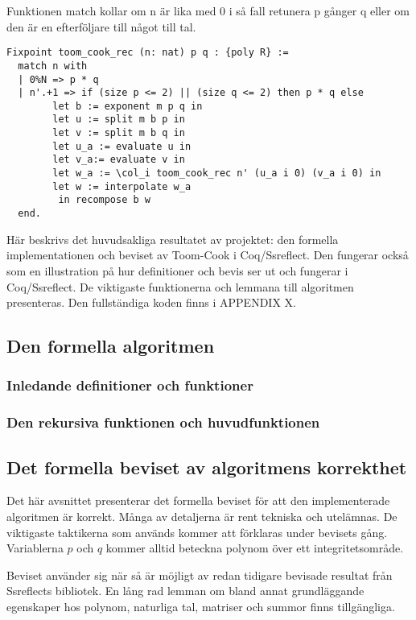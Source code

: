 Funktionen match kollar om n är lika med 0 i så fall retunera p gånger q eller
om den är en efterföljare till något till tal.

\begin{verbatim}
Fixpoint toom_cook_rec (n: nat) p q : {poly R} :=
  match n with
  | 0%N => p * q
  | n'.+1 => if (size p <= 2) || (size q <= 2) then p * q else
        let b := exponent m p q in
        let u := split m b p in
        let v := split m b q in
        let u_a := evaluate u in
        let v_a:= evaluate v in
        let w_a := \col_i toom_cook_rec n' (u_a i 0) (v_a i 0) in
        let w := interpolate w_a
         in recompose b w
  end.
\end{verbatim}
Här beskrivs det huvudsakliga resultatet av projektet: den formella
implementationen och beviset av Toom-Cook i Coq/Ssreflect. Den fungerar också
som en illustration på hur definitioner och bevis ser ut och fungerar i
Coq/Ssreflect. De viktigaste funktionerna och lemmana till algoritmen
presenteras. Den fullständiga koden finns i APPENDIX X.

\subsection{Den formella algoritmen}
\label{section:formalg}

\subsubsection{Inledande definitioner och funktioner}
\label{section:forminl}

\subsubsection{Den rekursiva funktionen och huvudfunktionen}
\label{section:formrec}

\subsection{Det formella beviset av algoritmens korrekthet}
Det här avsnittet presenterar det formella beviset för att den implementerade
algoritmen är korrekt. Många av detaljerna är rent tekniska och utelämnas. De
viktigaste taktikerna som används kommer att förklaras under bevisets gång.
Variablerna $p$ och $q$ kommer alltid beteckna polynom över ett
integritetsområde.

Beviset använder sig när så är möjligt av redan tidigare bevisade resultat från
Ssreflects bibliotek. En lång rad lemman om bland annat grundläggande
egenskaper hos polynom, naturliga tal, matriser och summor finns tillgängliga.

